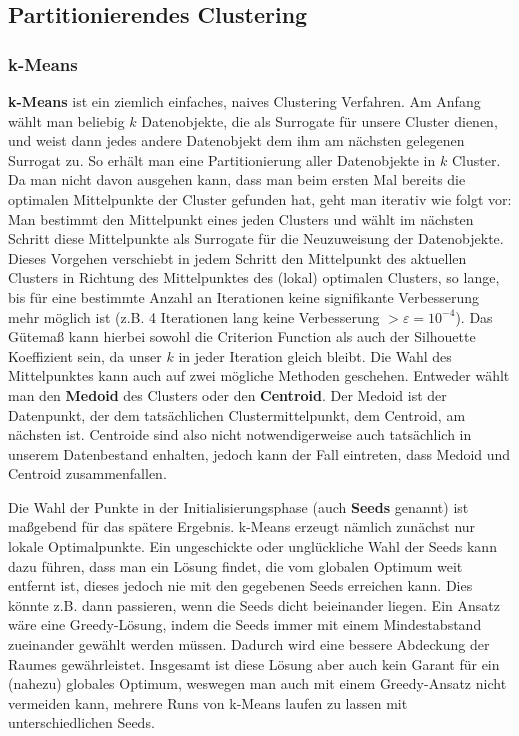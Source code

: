 \subsection{Partitionierendes Clustering}
\subsubsection{k-Means}
\textbf{k-Means} ist ein ziemlich einfaches, naives Clustering
Verfahren. Am Anfang wählt man beliebig \(k\) Datenobjekte,
die als Surrogate für unsere Cluster dienen, und weist dann jedes
andere Datenobjekt dem ihm am nächsten gelegenen Surrogat zu.
So erhält man eine Partitionierung aller Datenobjekte in \(k\) 
Cluster. Da man nicht davon ausgehen kann, dass man beim ersten
Mal bereits die optimalen Mittelpunkte der Cluster gefunden hat,
geht man iterativ wie folgt vor: Man bestimmt den Mittelpunkt eines
jeden Clusters und wählt im nächsten Schritt diese Mittelpunkte als
Surrogate für die Neuzuweisung der Datenobjekte. Dieses Vorgehen
verschiebt in jedem Schritt den Mittelpunkt des aktuellen Clusters
in Richtung des Mittelpunktes des (lokal) optimalen Clusters, so lange,
bis für eine bestimmte Anzahl an Iterationen keine signifikante 
Verbesserung mehr möglich ist (z.B. 4 Iterationen lang keine
Verbesserung \(> \varepsilon = 10^{-4}\)). Das Gütemaß kann
hierbei sowohl die Criterion Function als auch der Silhouette Koeffizient
sein, da unser \(k\) in jeder Iteration gleich bleibt. Die Wahl des
Mittelpunktes kann auch auf zwei mögliche Methoden geschehen.
Entweder wählt man den \textbf{Medoid} des Clusters oder den
\textbf{Centroid}. Der Medoid ist der Datenpunkt, der dem 
tatsächlichen Clustermittelpunkt, dem Centroid, am nächsten ist.
Centroide sind also nicht notwendigerweise auch tatsächlich in unserem
Datenbestand enhalten, jedoch kann der Fall eintreten, dass Medoid 
und Centroid zusammenfallen.

Die Wahl der Punkte in der Initialisierungsphase (auch \textbf{Seeds}
genannt) ist maßgebend für das spätere Ergebnis. k-Means erzeugt
nämlich zunächst nur lokale Optimalpunkte. Ein ungeschickte oder
unglückliche Wahl der Seeds kann dazu führen, dass man ein Lösung
findet, die vom globalen Optimum weit entfernt ist, dieses jedoch
nie mit den gegebenen Seeds erreichen kann. Dies könnte z.B. dann passieren, 
wenn die Seeds dicht beieinander liegen. Ein Ansatz wäre
eine Greedy-Lösung, indem die Seeds immer mit einem Mindestabstand
zueinander gewählt werden müssen. Dadurch wird eine bessere 
Abdeckung der Raumes gewährleistet. Insgesamt ist diese Lösung aber
auch kein Garant für ein (nahezu) globales Optimum, weswegen man
auch mit einem Greedy-Ansatz nicht vermeiden kann, mehrere Runs
von k-Means laufen zu lassen mit unterschiedlichen Seeds.

